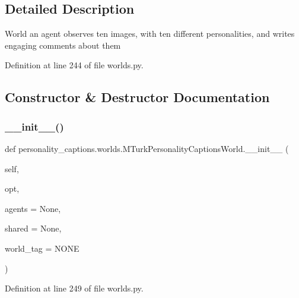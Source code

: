 \subsection{Detailed Description}
\begin{DoxyVerb}World an agent observes ten images, with ten different personalities,
    and writes engaging comments about them
\end{DoxyVerb}
 

Definition at line 244 of file worlds.\+py.



\subsection{Constructor \& Destructor Documentation}
\mbox{\label{classpersonality__captions_1_1worlds_1_1MTurkPersonalityCaptionsWorld_ab05199b7af0da7a70a52e5f563b7511d}} 
\subsubsection{\texorpdfstring{\+\_\+\+\_\+init\+\_\+\+\_\+()}{\_\_init\_\_()}}
{\footnotesize\ttfamily def personality\+\_\+captions.\+worlds.\+M\+Turk\+Personality\+Captions\+World.\+\_\+\+\_\+init\+\_\+\+\_\+ (\begin{DoxyParamCaption}\item[{}]{self,  }\item[{}]{opt,  }\item[{}]{agents = {\ttfamily None},  }\item[{}]{shared = {\ttfamily None},  }\item[{}]{world\+\_\+tag = {\ttfamily \textquotesingle{}NONE\textquotesingle{}} }\end{DoxyParamCaption})}



Definition at line 249 of file worlds.\+py.



